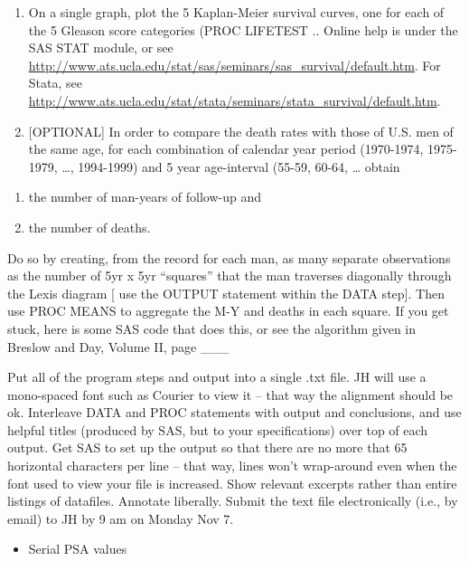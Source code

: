 \documentclass[]{book}
\providecommand{\tightlist}{%
  \setlength{\itemsep}{0pt}\setlength{\parskip}{0pt}}
\begin{document}
\begin{enumerate}
\def\labelenumi{\arabic{enumi}.}
\setcounter{enumi}{2}
\item
  On a single graph, plot the 5 Kaplan-Meier survival curves, one for each of the 5 Gleason score categories (PROC LIFETEST .. Online help is under the SAS STAT module, or see \url{http://www.ats.ucla.edu/stat/sas/seminars/sas_survival/default.htm}. For Stata, see \url{http://www.ats.ucla.edu/stat/stata/seminars/stata_survival/default.htm}.
\item
  {[}OPTIONAL{]} In order to compare the death rates with those of U.S. men of the same age, for each combination of calendar year period (1970-1974, 1975-1979, \ldots{}, 1994-1999) and 5 year age-interval (55-59, 60-64, \ldots{} obtain
\end{enumerate}

\begin{enumerate}
\def\labelenumi{\alph{enumi}.}
\item
  the number of man-years of follow-up and
\item
  the number of deaths.
\end{enumerate}

Do so by creating, from the record for each man, as many separate observations as the number of 5yr x 5yr ``squares'' that the man traverses diagonally through the Lexis diagram {[} use the OUTPUT statement within the DATA step{]}. Then use PROC MEANS to aggregate the M-Y and deaths in each square. If you get stuck, here is some SAS code that does this, or see the algorithm given in Breslow and Day, Volume II, page \_\_\_

Put all of the program steps and output into a single .txt file. JH will use a mono-spaced font such as Courier to view it -- that way the alignment should be ok. Interleave DATA and PROC statements with output and conclusions, and use helpful titles (produced by SAS, but to your specifications) over top of each output. Get SAS to set up the output so that there are no more that 65 horizontal characters per line -- that way, lines won't wrap-around even when the font used to view your file is increased. Show relevant excerpts rather than entire listings of datafiles. Annotate liberally. Submit the text file electronically (i.e., by email) to JH by 9 am on Monday Nov 7.

\begin{itemize}
\tightlist
\item
  Serial PSA values
\end{itemize}
\end{document}
